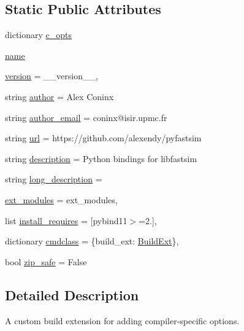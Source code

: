 \subsection*{Static Public Attributes}
\begin{DoxyCompactItemize}
\item 
dictionary \hyperlink{classsetup_1_1_build_ext_ad923dda6f6197eacc466b0def10d3297}{c\+\_\+opts}
\item 
\hyperlink{classsetup_1_1_build_ext_a63cde2a550ddf707e22d4f93dc271590}{name}
\item 
\hyperlink{classsetup_1_1_build_ext_ae0126fa9abc1ef98f9f444fa137a9cd3}{version} = \+\_\+\+\_\+version\+\_\+\+\_\+,
\item 
string \hyperlink{classsetup_1_1_build_ext_acb7fffd8091c0945d3952cabf7f488c5}{author} = \textquotesingle{}Alex Coninx\textquotesingle{}
\item 
string \hyperlink{classsetup_1_1_build_ext_a364654c19ddf5c6a26a11e7799121565}{author\+\_\+email} = \textquotesingle{}coninx@isir.\+upmc.\+fr\textquotesingle{}
\item 
string \hyperlink{classsetup_1_1_build_ext_a968e2d21a5cf459eb0091efa406b8e2c}{url} = \textquotesingle{}https\+://github.\+com/alexendy/pyfastsim\textquotesingle{}
\item 
string \hyperlink{classsetup_1_1_build_ext_a4ddc07d45d333fc55922d5f840e1c102}{description} = \textquotesingle{}Python bindings for libfastsim\textquotesingle{}
\item 
string \hyperlink{classsetup_1_1_build_ext_a92bd98830f1ca88bc0806bf2883f5ab1}{long\+\_\+description} = \textquotesingle{}\textquotesingle{}
\item 
\hyperlink{classsetup_1_1_build_ext_ade2fbdb58cb8589f4200ccc45ae698b5}{ext\+\_\+modules} = ext\+\_\+modules,
\item 
list \hyperlink{classsetup_1_1_build_ext_a12adc406aee45851d969d0b07b538df7}{install\+\_\+requires} = \mbox{[}\textquotesingle{}pybind11$>$=2.\textquotesingle{}\mbox{]},
\item 
dictionary \hyperlink{classsetup_1_1_build_ext_a331bbe264b05f2da56fa133ece4b5ee0}{cmdclass} = \{\textquotesingle{}build\+\_\+ext\textquotesingle{}\+: \hyperlink{classsetup_1_1_build_ext}{Build\+Ext}\},
\item 
bool \hyperlink{classsetup_1_1_build_ext_a03620bc93383f8f6667f07e5663280a6}{zip\+\_\+safe} = False
\end{DoxyCompactItemize}


\subsection{Detailed Description}
\begin{DoxyVerb}A custom build extension for adding compiler-specific options.\end{DoxyVerb}
 

